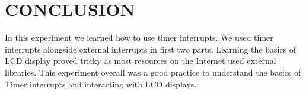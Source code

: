 \documentclass[pdftex,12pt,a4paper]{article}
\begin{document}
\section{CONCLUSION}
In this experiment we learned how to use timer interrupts. We used timer interrupts alongside external interrupts in first two parts. Learning the basics of LCD display proved tricky as most resources on the Internet used external libraries. This experiment overall was a good practice to understand the basics of Timer interrupts and interacting with LCD displays.
\end{document}
